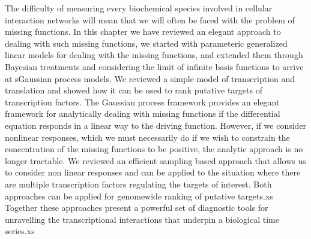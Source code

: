 \documentclass{article}
\begin{document}
The difficulty of measuring every biochemical species involved in
cellular interaction networks will mean that we will often be faced
with the problem of missing functions. In this chapter we have
reviewed an elegant approach to dealing with such missing functions,
we started with parameteric generalized linear models for dealing with
the missing functions, and extended them through Bayesian treatments
and considering the limit of infinite basis functions to arrive at
sGaussian process models. We reviewed a simple model of transcription
and translation and showed how it can be used to rank putative targets
of transcription factors. The Gaussian process framework provides an
elegant framework for analytically dealing with missing functions if
the differential equation responds in a linear way to the driving
function. However, if we consider nonlinear responses, which we must
necessarily do if we wish to constrain the concentration of the
missing functions to be positive, the analytic approach is no longer
tractable. We reviewed an efficient sampling based approach that
allows us to consider non linear responses and can be applied to the
situation where there are multiple transcription factors regulating
the targets of interest. Both approaches can be applied for genomewide
ranking of putative targets.xs Together these approaches present a
powerful set of diagnostic tools for unravelling the transcriptional
interactions that underpin a biological time series.xs




  
\end{document}
